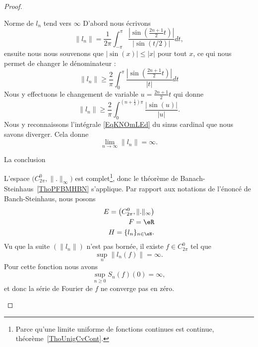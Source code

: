 \begin{proof}
\begin{subproof}
        \item[Norme de \( l_n\) tend vers \( \infty\)]
            D'abord nous écrivons
            \begin{equation}
                \| l_n \|=\frac{1}{ 2\pi }\int_{-\pi}^{\pi}\frac{ \left| \sin\left( \frac{ 2n+1 }{2}t \right) \right|  }{ \big| \sin(t/2) \big| }dt,
            \end{equation}
            ensuite nous nous souvenons que \( | \sin(x) |\leq | x |\) pour tout \( x\), ce qui nous permet de changer le dénominateur :
            \begin{equation}
                \| l_n \|\geq \frac{ 2 }{ \pi }\int_0^{\pi}\frac{ \left| \sin\left( \frac{ 2n+1 }{2}t \right) \right|  }{ | t | }dt
            \end{equation}
            Nous y effectuons le changement de variable \( u=\frac{ 2n+1 }{2}t\) qui donne
            \begin{equation}
                \| l_n \|\geq \frac{ 2 }{ \pi }\int_{0}^{(n+\frac{ 1 }{2})\pi}\frac{ \big| \sin(u) \big| }{ | u | }.
            \end{equation}
            Nous y reconnaissons l'intégrale \eqref{EqKNOmLEd} du sinus cardinal que nous savons diverger. Cela donne
            \begin{equation}
                \lim_{n\to \infty} \| l_n \|=\infty.
            \end{equation}
        \item[La conclusion]

            L'espace \( \big( C^0_{2\pi},\| . \|_{\infty} \big)\) est complet\footnote{Parce qu'une limite uniforme de fonctions continues est continue, théorème~\ref{ThoUnigCvCont}.}, donc le théorème de Banach-Steinhaus~\ref{ThoPFBMHBN} s'applique. Par rapport aux notations de l'énoncé de Banch-Steinhaus, nous posons
            \begin{subequations}
                \begin{align}
                    E=\big( C^0_{2\pi},\| . \|_{\infty} \big)\\
                    F=\eR\\
                    H=\{ l_n \}_{n\in \eN}.
                \end{align}
            \end{subequations}
            Vu que la suite \( (\| l_n \|)\) n'est pas bornée, il existe \( f\in C^0_{2\pi}\) tel que
            \begin{equation}
                \sup_n\| l_n(f) \|=\infty.
            \end{equation}
            Pour cette fonction nous avons
            \begin{equation}
                \sup_{n\geq 0}S_n(f)(0)=\infty,
            \end{equation}
            et donc la série de Fourier de \( f\) ne converge pas en zéro.

        \end{subproof}
\end{proof}


